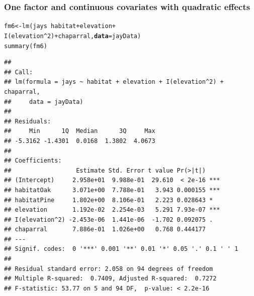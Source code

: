 \documentclass[color=usenames,dvipsnames]{beamer}\usepackage[]{graphicx}\usepackage[]{color}
\makeatletter
\newcommand{\hlnum}[1]{\textcolor[rgb]{0.69,0.494,0}{#1}}%
\newcommand{\hlopt}[1]{\textcolor[rgb]{0,0,0}{#1}}%
\newcommand{\hlstd}[1]{\textcolor[rgb]{0,0,0}{#1}}%
\newcommand{\hlkwb}[1]{\textcolor[rgb]{0,0.341,0.682}{#1}}%
\newcommand{\hlkwc}[1]{\textcolor[rgb]{0,0,0}{\textbf{#1}}}%
\newcommand{\hlkwd}[1]{\textcolor[rgb]{0.004,0.004,0.506}{#1}}%
\newenvironment{kframe}{%
 \def\at@end@of@kframe{}%
 \ifinner\ifhmode%
  \def\at@end@of@kframe{\end{minipage}}%
  \begin{minipage}{\columnwidth}%
 \fi\fi%
 \def\FrameCommand##1{\hskip\@totalleftmargin \hskip-\fboxsep
 \colorbox{shadecolor}{##1}\hskip-\fboxsep
     \hskip-\linewidth \hskip-\@totalleftmargin \hskip\columnwidth}%
 \MakeFramed {\advance\hsize-\width
   \@totalleftmargin\z@ \linewidth\hsize
   \@setminipage}}%
 {\par\unskip\endMakeFramed%
 \at@end@of@kframe}
\newenvironment{knitrout}{}{} %
\makeatother
\begin{document}
\begin{frame}[fragile]
  \frametitle{\small One factor and continuous covariates with quadratic effects}
  \tiny
\begin{knitrout}\scriptsize
{}\color{fgcolor}\begin{kframe}
\begin{alltt}
\hlstd{fm6} \hlkwb{<-} \hlkwd{lm}\hlstd{(jays} \hlopt{~} \hlstd{habitat} \hlopt{+} \hlstd{elevation} \hlopt{+}
          \hlkwd{I}\hlstd{(elevation}\hlopt{^}\hlnum{2}\hlstd{)} \hlopt{+} \hlstd{chaparral,} \hlkwc{data}\hlstd{=jayData)}
\hlkwd{summary}\hlstd{(fm6)}
\end{alltt}
\begin{verbatim}
## 
## Call:
## lm(formula = jays ~ habitat + elevation + I(elevation^2) + chaparral, 
##     data = jayData)
## 
## Residuals:
##     Min      1Q  Median      3Q     Max 
## -5.3162 -1.4301  0.0168  1.3802  4.0673 
## 
## Coefficients:
##                  Estimate Std. Error t value Pr(>|t|)    
## (Intercept)     2.958e+01  9.988e-01  29.610  < 2e-16 ***
## habitatOak      3.071e+00  7.788e-01   3.943 0.000155 ***
## habitatPine     1.802e+00  8.106e-01   2.223 0.028643 *  
## elevation       1.192e-02  2.254e-03   5.291 7.93e-07 ***
## I(elevation^2) -2.453e-06  1.441e-06  -1.702 0.092075 .  
## chaparral       7.886e-01  1.026e+00   0.768 0.444177    
## ---
## Signif. codes:  0 '***' 0.001 '**' 0.01 '*' 0.05 '.' 0.1 ' ' 1
## 
## Residual standard error: 2.058 on 94 degrees of freedom
## Multiple R-squared:  0.7409,	Adjusted R-squared:  0.7272 
## F-statistic: 53.77 on 5 and 94 DF,  p-value: < 2.2e-16
\end{verbatim}
\end{kframe}
\end{knitrout}
\end{frame}
\end{document}
